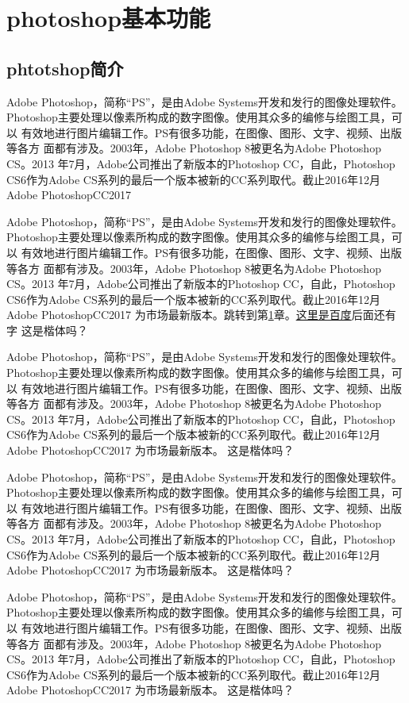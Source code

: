 
\mylineskip
\chapter{photoshop基本功能}\label{chaper:ch1}
\section{phtotshop简介}
Adobe Photoshop，简称“PS”，是由Adobe Systems开发和发行的图像处理软件。
Photoshop主要处理以像素所构成的数字图像。使用其众多的编修与绘图工具，可以
有效地进行图片编辑工作。PS有很多功能，在图像、图形、文字、视频、出版等各方
面都有涉及。2003年，Adobe Photoshop 8被更名为Adobe Photoshop CS。2013
年7月，Adobe公司推出了新版本的Photoshop CC，自此，Photoshop CS6作为Adobe
 CS系列的最后一个版本被新的CC系列取代。截止2016年12月Adobe PhotoshopCC2017
 
 
 Adobe Photoshop，简称“PS”，是由Adobe Systems开发和发行的图像处理软件。
 Photoshop主要处理以像素所构成的数字图像。使用其众多的编修与绘图工具，可以
 有效地进行图片编辑工作。PS有很多功能，在图像、图形、文字、视频、出版等各方
 面都有涉及。2003年，Adobe Photoshop 8被更名为Adobe Photoshop CS。2013
 年7月，Adobe公司推出了新版本的Photoshop CC，自此，Photoshop CS6作为Adobe
 CS系列的最后一个版本被新的CC系列取代。截止2016年12月Adobe PhotoshopCC2017
 为市场最新版本。跳转到第\ref{chaper:ch1}章。\href{http://www.baidu.com}{这里是百度}后面还有字
 {\kaishu 这是楷体吗？}
 
  Adobe Photoshop，简称“PS”，是由Adobe Systems开发和发行的图像处理软件。
 Photoshop主要处理以像素所构成的数字图像。使用其众多的编修与绘图工具，可以
 有效地进行图片编辑工作。PS有很多功能，在图像、图形、文字、视频、出版等各方
 面都有涉及。2003年，Adobe Photoshop 8被更名为Adobe Photoshop CS。2013
 年7月，Adobe公司推出了新版本的Photoshop CC，自此，Photoshop CS6作为Adobe
 CS系列的最后一个版本被新的CC系列取代。截止2016年12月Adobe PhotoshopCC2017
 为市场最新版本。
 {\kaishu 这是楷体吗？}
 
  Adobe Photoshop，简称“PS”，是由Adobe Systems开发和发行的图像处理软件。
 Photoshop主要处理以像素所构成的数字图像。使用其众多的编修与绘图工具，可以
 有效地进行图片编辑工作。PS有很多功能，在图像、图形、文字、视频、出版等各方
 面都有涉及。2003年，Adobe Photoshop 8被更名为Adobe Photoshop CS。2013
 年7月，Adobe公司推出了新版本的Photoshop CC，自此，Photoshop CS6作为Adobe
 CS系列的最后一个版本被新的CC系列取代。截止2016年12月Adobe PhotoshopCC2017
 为市场最新版本。
 {\kaishu 这是楷体吗？}
 
  Adobe Photoshop，简称“PS”，是由Adobe Systems开发和发行的图像处理软件。
 Photoshop主要处理以像素所构成的数字图像。使用其众多的编修与绘图工具，可以
 有效地进行图片编辑工作。PS有很多功能，在图像、图形、文字、视频、出版等各方
 面都有涉及。2003年，Adobe Photoshop 8被更名为Adobe Photoshop CS。2013
 年7月，Adobe公司推出了新版本的Photoshop CC，自此，Photoshop CS6作为Adobe
 CS系列的最后一个版本被新的CC系列取代。截止2016年12月Adobe PhotoshopCC2017
 为市场最新版本。
 {\kaishu 这是楷体吗？}
 
